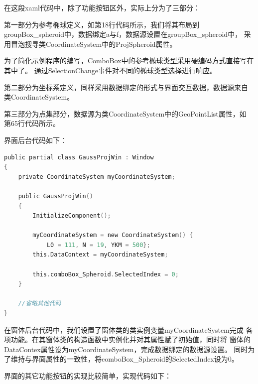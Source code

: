在这段xaml代码中，除了功能按钮区外，实际上分为了三部分：

第一部分为参考椭球定义，如第18行代码所示，我们将其布局到
 groupBox\_spheroid中，数据绑定a与f，数据源设置在groupBox\_spheroid中，
 采用冒泡搜寻类CoordinateSystem中的ProjSpheroid属性。

为了简化示例程序的编写，ComboBox中的参考椭球类型采用硬编码方式直接写在其中了。
通过SelectionChange事件对不同的椭球类型选择进行响应。

第二部分为坐标系定义，同样采用数据绑定的形式与界面交互数据，数据源来自
类CoordinateSystem。

第三部分为点集部分，数据源为类CoordinateSystem中的GeoPointList属性，如
第65行代码所示。

界面后台代码如下：

\begin{lstlisting}[language=C]
public partial class GaussProjWin : Window
{       
    private CoordinateSystem myCoordinateSystem;

    public GaussProjWin()
    {
        InitializeComponent();

        myCoordinateSystem = new CoordinateSystem() {
            L0 = 111, N = 19, YKM = 500};
        this.DataContext = myCoordinateSystem;

        this.comboBox_Spheroid.SelectedIndex = 0;
    }

    //省略其他代码
}
\end{lstlisting}

在窗体后台代码中，我们设置了窗体类的类实例变量myCoordinateSystem完成
各项功能。在其窗体类的构造函数中实例化并对其属性赋了初始值，同时将
窗体的DataContex属性设为myCoordinateSystem，完成数据绑定的数据源设置。
同时为了维持与界面属性的一致性，将comboBox\_Spheroid的SelectedIndex设为0。

界面的其它功能按钮的实现比较简单，实现代码如下：

